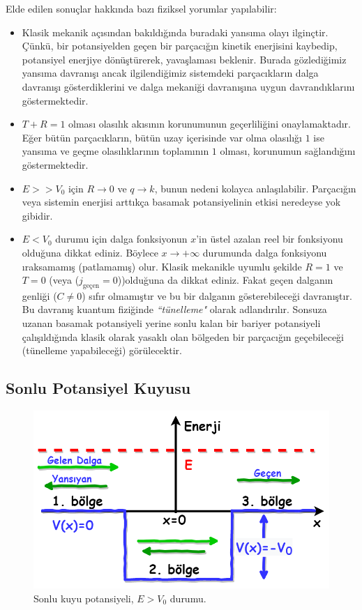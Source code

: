 \documentclass[a4paper,12pt, twoside]{article}
\begin{document}
Elde edilen sonuçlar hakkında bazı fiziksel yorumlar yapılabilir:
\begin{itemize}
	\item Klasik mekanik açısından bakıldığında buradaki yansıma olayı ilginçtir. Çünkü, bir potansiyelden geçen bir parçacığın kinetik enerjisini kaybedip, potansiyel enerjiye dönüştürerek, yavaşlaması beklenir. Burada gözlediğimiz yansıma davranışı ancak ilgilendiğimiz sistemdeki parçacıkların dalga davranışı gösterdiklerini ve dalga mekaniği davranışına uygun davrandıklarını göstermektedir.
	
	\item $T + R = 1$ olması olasılık akısının korunumunun geçerliliğini onaylamaktadır. Eğer bütün parçacıkların, bütün uzay içerisinde var olma olasılığı $1$ ise yansıma ve geçme olasılıklarının toplamının $1$ olması, korunumun sağlandığını göstermektedir.
	
	\item $E>>V_0$ için $R\rightarrow0$ ve $q\rightarrow k$, bunun nedeni kolayca anlaşılabilir. Parçacığın veya sistemin enerjisi arttıkça basamak potansiyelinin etkisi neredeyse yok gibidir.
	
	\item $E<V_0$ durumu için dalga fonksiyonun $x$'in üstel azalan reel bir fonksiyonu olduğuna dikkat ediniz. Böylece $x\rightarrow+\infty$ durumunda dalga fonksiyonu ıraksamamış (patlamamış) olur. Klasik mekanikle uyumlu şekilde $R=1$ ve $T=0$ (veya ($j_\text{geçen} = 0$))olduğuna da dikkat ediniz. Fakat geçen dalganın genliği ($C\neq0$) sıfır olmamıştır ve bu bir dalganın gösterebileceği davranıştır. Bu davranış kuantum fiziğinde \emph{``tünelleme"} olarak adlandırılır. Sonsuza uzanan basamak potansiyeli yerine sonlu kalan bir bariyer potansiyeli çalışıldığında klasik olarak yasaklı olan bölgeden bir parçacığın geçebileceği (tünelleme yapabileceği) görülecektir. 
	
\end{itemize}

\subsection{Sonlu Potansiyel Kuyusu}

\begin{figure}[hbtp]
	\centering
	\includegraphics[width=0.7\linewidth]{figurler/SonluKuyu_Potansiyeli.png}
	\caption{Sonlu kuyu potansiyeli, $E>V_0$ durumu.}
	\label{fig:sonlukuyupotansiyeli}
\end{figure}
\end{document}
